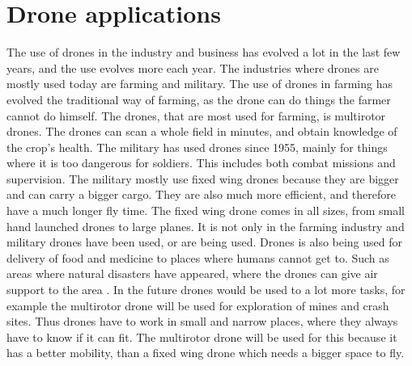 \section{Drone applications}
The use of drones in the industry and business has evolved a lot in the last few years, and the use evolves more each year. 
The industries where drones are mostly used today are farming and military.
\newline
The use of drones in farming has evolved the traditional way of farming, as the drone can do things the farmer cannot do himself. The drones, that are most used for farming, is multirotor drones. The drones can scan a whole field in minutes, and obtain knowledge of the crop's health. 
\newline
\newline
The military has used drones since 1955, mainly for things where it is too dangerous for soldiers. This includes both combat missions and supervision. The military mostly use fixed wing drones because they are bigger and can carry a bigger cargo. They are also much more efficient, and therefore have a much longer fly time. The fixed wing drone comes in all sizes, from small hand launched drones to large planes.
\newline
\newline
It is not only in the farming industry and military drones have been used, or are being used.
Drones is also being used for delivery of food and medicine to places where humans cannot get to. Such as areas where natural disasters have appeared, where the drones can give air support to the area \cite{drones_in_generel}.
\newline
In the future drones would be used to a lot more tasks, for example the multirotor drone will be used for exploration of mines and crash sites. Thus drones have to work in small and narrow places, where they always have to know if it can fit. The multirotor drone will be used for this because it has a better mobility, than a fixed wing drone which needs a bigger space to fly.